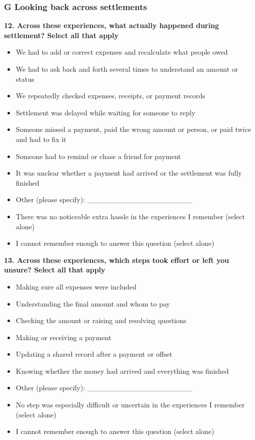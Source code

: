 \subsubsection*{G Looking back across settlements}

\par\smallskip\noindent\textbf{12. Across these experiences, what actually happened during settlement? Select all that apply}\par\nobreak

\begin{itemize}
\item
  We had to add or correct expenses and recalculate what people owed
\item
  We had to ask back and forth several times to understand an amount or status
\item
  We repeatedly checked expenses, receipts, or payment records
\item
  Settlement was delayed while waiting for someone to reply
\item
  Someone missed a payment, paid the wrong amount or person, or paid twice and had to fix it
\item
  Someone had to remind or chase a friend for payment
\item
  It was unclear whether a payment had arrived or the settlement was fully finished
\item
  Other (please specify): \_\_\_\_\_\_\_\_\_\_\_\_\_\_\_\_\_\_\_\_
\item
  There was no noticeable extra hassle in the experiences I remember (select alone)
\item
  I cannot remember enough to answer this question (select alone)
\end{itemize}

\par\smallskip\noindent\textbf{13. Across these experiences, which steps took effort or left you unsure? Select all that apply}\par\nobreak

\begin{itemize}
\item
  Making sure all expenses were included
\item
  Understanding the final amount and whom to pay
\item
  Checking the amount or raising and resolving questions
\item
  Making or receiving a payment
\item
  Updating a shared record after a payment or offset
\item
  Knowing whether the money had arrived and everything was finished
\item
  Other (please specify): \_\_\_\_\_\_\_\_\_\_\_\_\_\_\_\_\_\_\_\_
\item
  No step was especially difficult or uncertain in the experiences I remember (select alone)
\item
  I cannot remember enough to answer this question (select alone)
\end{itemize}

